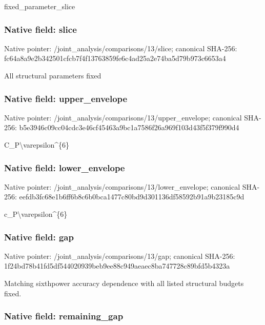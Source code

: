 \documentclass[10pt,a4paper]{article}
\begin{document}
fixed\_parameter\_slice


\subsubsection{Native field: slice}


Native pointer: /joint\_analysis/comparisons/13/slice; canonical SHA-256: fc64a8a9e2b342501cfcb7f4\allowbreak{}f13763859fe6c4ad25a2e74b\allowbreak{}a5d79b973c6653a4


All structural parameters fixed


\subsubsection{Native field: upper\_envelope}


Native pointer: /joint\_analysis/comparis\allowbreak{}ons/13/upper\_envelope; canonical SHA-256: b5e3946c09cc04cdc3e46cf4\allowbreak{}5463a9bc1a7586f26a969f10\allowbreak{}3d43f5f379f990d4


C\_P\textbackslash{}varepsilon\textasciicircum{}\{6\}


\subsubsection{Native field: lower\_envelope}


Native pointer: /joint\_analysis/comparis\allowbreak{}ons/13/lower\_envelope; canonical SHA-256: eefdb3fc68e1b6ff6b8c6b0b\allowbreak{}ca1477c80bd9d301136df585\allowbreak{}92b91a9b23185c9d


c\_P\textbackslash{}varepsilon\textasciicircum{}\{6\}


\subsubsection{Native field: gap}


Native pointer: /joint\_analysis/comparisons/13/gap; canonical SHA-256: 1f24bd78b41fd5df54402093\allowbreak{}9beb9ee88c949aeaec8ba747\allowbreak{}728c89bfd5b4323a


Matching sixthpower accuracy dependence with all listed structural budgets fixed.


\subsubsection{Native field: remaining\_gap}
\end{document}
